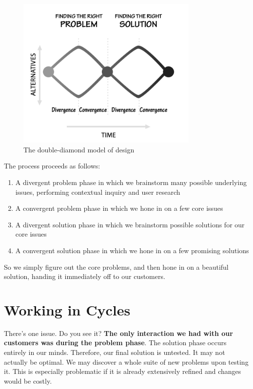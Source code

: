 \documentclass[12pt]{article}
\begin{document}
\begin{figure}[htbp]
\centering
\includegraphics[width=0.8\textwidth]{diamond.png}
\caption{The double-diamond model of design}
\end{figure}

The process proceeds as follows:

\begin{enumerate}
\item A divergent problem phase in which we brainstorm many possible underlying issues, performing contextual inquiry and user research
\item A convergent problem phase in which we hone in on a few core issues
\item A divergent solution phase in which we brainstorm possible solutions for our core issues
\item A convergent solution phase in which we hone in on a few promising solutions
\end{enumerate}

So we simply figure out the core problems, and then hone in on a beautiful solution, handing it immediately off to our customers.

\section*{Working in Cycles}

There's one issue. Do you see it? \textbf{The only interaction we had with our customers was during the problem phase}. The solution phase occurs entirely in our minds. Therefore, our final solution is untested. It may not actually be optimal. We may discover a whole suite of new problems upon testing it. This is especially problematic if it is already extensively refined and changes would be costly. 
\end{document}
